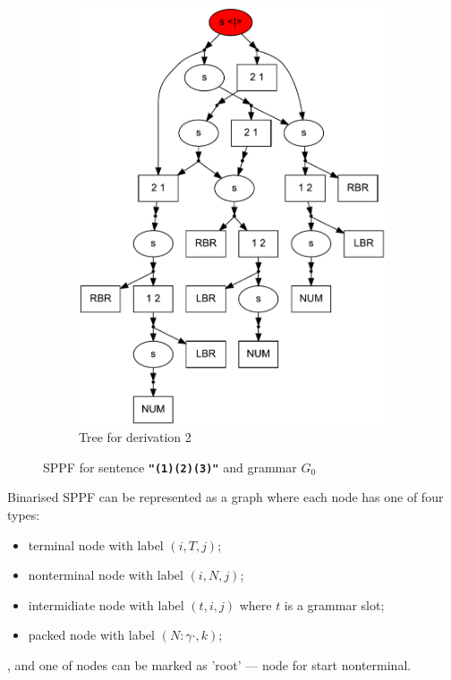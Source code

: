 \documentclass{sig-alternate} %
\begin{document}
\begin{figure}[ht]
\begin{center}
\begin{subfigure}[b]{0.3\textwidth}
        \includegraphics[width=\textwidth]{dot/Brackets.pdf}
        \caption{Tree for derivation 2}
        \label{tree2}        
    \end{subfigure}
    \caption{SPPF for sentence \textbf{\texttt{"(1)(2)(3)"}} and grammar $G_0$}
    \label{sppfSample}
    \end{center}                
\end{figure}

Binarised SPPF can be represented as a graph where each node has one of four types: 

\begin{itemize}
    \item terminal node with label $(i,T,j)$;
    \item nonterminal node with label $(i,N,j)$;
    \item intermidiate node with label $(t,i,j)$ where $t$ is a grammar slot;
    \item packed node with label $(N : \gamma \cdot, k)$;
\end{itemize}
, and one of nodes can be marked as 'root' --- node for start nonterminal.
\end{document}
